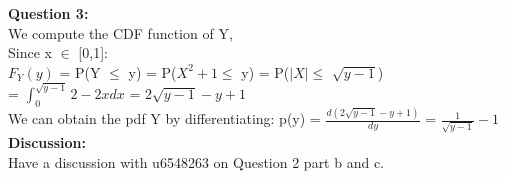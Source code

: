 \documentclass{article}
\begin{document}
\textbf{Question 3:}\\
We compute the CDF function of Y,\\
Since x $\in$ [0,1]:\\
$F_Y(y)$ = P(Y $\leq$ y) = P($X^2+1 \leq$ y) = P($|X| \leq$ $\sqrt{y-1}$)  \\= $\int_{0}^{\sqrt{y-1}} 2-2x dx$ = $2\sqrt{y-1}-y+1$\\
We can obtain the pdf Y by differentiating:
p(y) = $\frac{d(2\sqrt{y-1}-y+1)}{dy}$ = $\frac{1}{\sqrt{y-1}}-1$\\



\newpage
\textbf{Discussion:}\\
Have a discussion with u6548263 on Question 2 part b and c.
\end{document}
